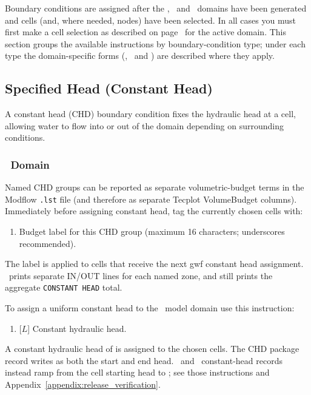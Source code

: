\label{section:BoundaryConditions}
Boundary conditions are assigned after the \gwf, \swf\ and \cln\ domains have been generated and cells (and, where needed, nodes) have been selected.
In all cases you must first make a cell selection as described on page~\pageref{page:cellSelect} for the active domain.
This section groups the available instructions by boundary-condition type; under each type the domain-specific forms (\gwf, \swf\ and \cln) are described where they apply.

\subsection{Specified Head (Constant Head)}
A constant head (CHD) boundary condition fixes the hydraulic head at a cell, allowing water to flow into or out of the domain depending on surrounding conditions.

\subsubsection{\gwf\ Domain}
Named CHD groups can be reported as separate volumetric-budget terms in the Modflow \texttt{.lst} file (and therefore as separate Tecplot VolumeBudget columns). Immediately before assigning constant head, tag the currently chosen cells with:

    {
        \squish
        \begin{enumerate}
        \item {}   Budget label for this CHD group (maximum 16 characters; underscores recommended).
        \end{enumerate}
          The label is applied to cells that receive the next {\sf gwf constant head} assignment. \mfus\ prints separate IN/OUT lines for each named zone, and still prints the aggregate \texttt{CONSTANT HEAD} total.
    }

To assign a uniform constant head to the \gwf\ model domain use this instruction:

    {
        \squish
        \begin{enumerate}
        \item {} [$L$]   Constant hydraulic head.
        \end{enumerate}
          A constant hydraulic head of  is assigned to the chosen cells.
          The CHD package record writes  as both the start and end head. \cln\ and \swf\ constant-head records instead ramp from the cell starting head to ; see those instructions and Appendix~\ref{appendix:release_verification}.
    }

